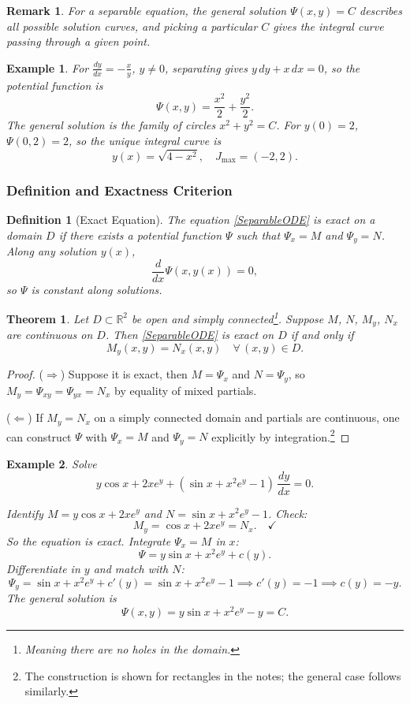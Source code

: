 \documentclass{article}
\newtheorem{theorem}{Theorem}
\newtheorem{definition}{Definition}
\newtheorem*{example}{Example}
\newtheorem{remark}{Remark}
\newcommand{\R}{\mathbb{R}}
\begin{document}
\begin{remark}
    For a separable equation, the general solution $\Psi(x,y) = C$ describes all possible solution curves, and picking a particular $C$ gives the integral curve passing through a given point.
\end{remark}
\begin{example}
    For $\frac{dy}{dx} = -\frac{x}{y}$, $y \neq 0$, separating gives $y\,dy + x\,dx = 0$, so the potential function is
    \[\Psi(x,y) = \frac{x^2}{2} + \frac{y^2}{2}.\]
    The general solution is the family of circles $x^2+y^2 = C$. For $y(0)=2$, $\Psi(0,2)=2$, so the unique integral curve is
    \[y(x) = \sqrt{4-x^2}, \quad J_{\max} = (-2,2).\]
\end{example}

\subsubsection{Definition and Exactness Criterion}
\begin{definition}[Exact Equation]
    The equation \eqref{SeparableODE} is exact on a domain $D$ if there exists a potential function $\Psi$ such that $\Psi_x = M$ and $\Psi_y = N$. Along any solution $y(x)$,
    \[\frac{d}{dx}\Psi(x,y(x)) = 0,\]
    so $\Psi$ is constant along solutions.
\end{definition}
\begin{theorem}
    Let $D\subset\R^2$ be open and simply connected\footnote{Meaning there are no holes in the domain.}. Suppose $M$, $N$, $M_y$, $N_x$ are continuous on $D$. Then \eqref{SeparableODE} is exact on $D$ if and only if
    \[M_y(x,y) = N_x(x,y) \quad \forall\,(x,y)\in D.\]
\end{theorem}
\begin{proof}
    ($\Rightarrow$) Suppose it is exact, then $M = \Psi_x$ and $N = \Psi_y$, so $M_y = \Psi_{xy} = \Psi_{yx} = N_x$ by equality of mixed partials.

    ($\Leftarrow$) If $M_y = N_x$ on a simply connected domain and 
    partials are continuous, one can construct $\Psi$ with 
    $\Psi_x = M$ and $\Psi_y = N$ explicitly by integration.\footnote{The construction is shown for rectangles in the notes; the general case follows similarly.}
\end{proof}
\begin{example}
    Solve
    \[y\cos x + 2xe^y + (\sin x + x^2e^y - 1)\,\frac{dy}{dx} = 0.\]

    Identify $M = y\cos x + 2xe^y$ and $N = \sin x + x^2e^y - 1$. Check:
    \[M_y = \cos x + 2xe^y = N_x. \quad \checkmark\]
    So the equation is exact. Integrate $\Psi_x = M$ in $x$:
    \[\Psi = y\sin x + x^2e^y + c(y).\]
    Differentiate in $y$ and match with $N$:
    \[\Psi_y = \sin x + x^2e^y + c'(y) = \sin x + x^2e^y - 1 
    \implies c'(y) = -1 \implies c(y) = -y.\]
    The general solution is
    \[\Psi(x,y) = y\sin x + x^2e^y - y = C.\]
\end{example}
\end{document}
